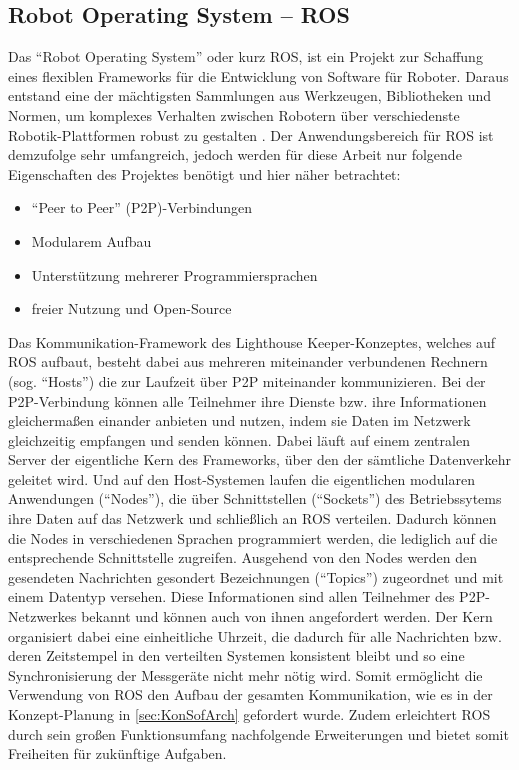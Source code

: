 \subsection{Robot Operating System -- ROS}
Das "`Robot Operating System"' oder kurz ROS, ist ein Projekt zur Schaffung eines flexiblen Frameworks für die Entwicklung von Software für Roboter. Daraus entstand eine der mächtigsten Sammlungen aus Werkzeugen, Bibliotheken und Normen, um komplexes Verhalten zwischen Robotern über verschiedenste Robotik-Plattformen robust zu gestalten \cite{ROSErkl}. Der Anwendungsbereich für ROS ist demzufolge sehr umfangreich, jedoch werden für diese Arbeit nur folgende Eigenschaften \cite{ROSPaper} des Projektes benötigt und hier näher betrachtet:
\begin{itemize}
\item "`Peer to Peer"' (P2P)-Verbindungen
\item Modularem Aufbau
\item Unterstützung mehrerer Programmiersprachen
\item freier Nutzung und Open-Source
\end{itemize}
Das Kommunikation-Framework des Lighthouse Keeper-Konzeptes, welches auf ROS aufbaut, besteht dabei aus mehreren miteinander verbundenen Rechnern (sog. "`Hosts"') die zur Laufzeit über P2P miteinander kommunizieren. Bei der P2P-Verbindung können alle Teilnehmer ihre Dienste bzw. ihre Informationen gleichermaßen einander anbieten und nutzen, indem sie Daten im Netzwerk gleichzeitig empfangen und senden können. Dabei läuft auf einem zentralen Server der eigentliche Kern des Frameworks, über den der sämtliche Datenverkehr geleitet wird. Und auf den Host-Systemen laufen die eigentlichen modularen Anwendungen ("`Nodes"'), die über Schnittstellen ("`Sockets"') des Betriebssytems ihre Daten auf das Netzwerk und schließlich an ROS verteilen. Dadurch können die Nodes in verschiedenen Sprachen programmiert werden, die lediglich auf die entsprechende Schnittstelle zugreifen. Ausgehend von den Nodes werden den gesendeten Nachrichten gesondert Bezeichnungen ("`Topics"') zugeordnet und mit einem Datentyp versehen. Diese Informationen sind allen Teilnehmer des P2P-Netzwerkes bekannt und können auch von ihnen angefordert werden. Der Kern organisiert dabei eine einheitliche Uhrzeit, die dadurch für alle Nachrichten bzw. deren Zeitstempel in den verteilten Systemen konsistent bleibt und so eine Synchronisierung der Messgeräte nicht mehr nötig wird. Somit ermöglicht die Verwendung von ROS den Aufbau der gesamten Kommunikation, wie es in der Konzept-Planung in \ref{sec:KonSofArch} gefordert wurde. Zudem erleichtert ROS durch sein großen Funktionsumfang nachfolgende Erweiterungen und bietet somit Freiheiten für zukünftige Aufgaben.
